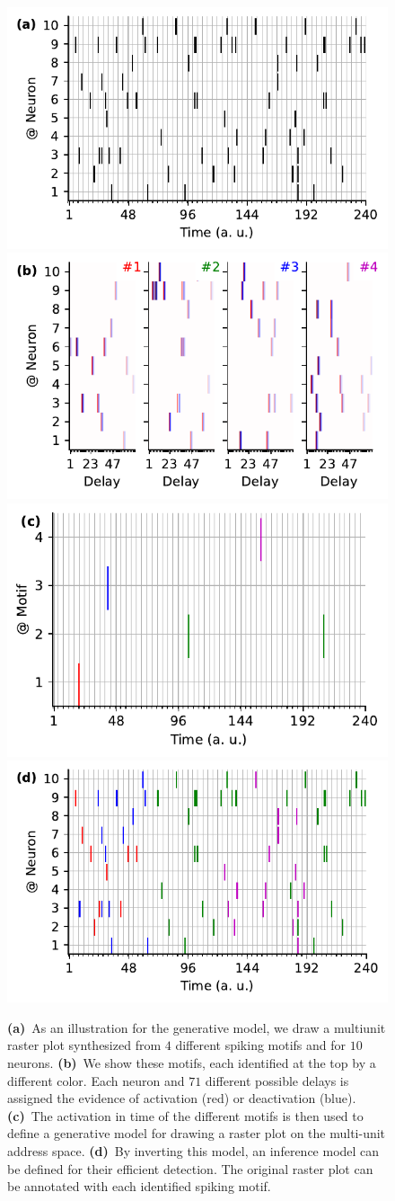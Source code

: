 \documentclass[runningheads]{llncs}
\begin{document}
\begin{figure}[t]%
    \includegraphics[width=.50\linewidth]{figures/THC_1a_k.pdf}
    \includegraphics[width=.46\linewidth]{figures/THC_1b.pdf}\\
  \includegraphics[width=.50\linewidth]{figures/THC_1c.pdf}
    \includegraphics[width=.50\linewidth]{figures/THC_1a.pdf}
  
\caption{\textbf{(a)}~As an illustration for the generative model, we draw a multiunit raster plot synthesized from $4$ different spiking motifs and for $10$ neurons. \textbf{(b)}~We show these motifs, each identified at the top by a different color. Each neuron and $71$ different possible delays is assigned the evidence of activation (red) or deactivation (blue). \textbf{(c)}~The activation in time of the different motifs is then used to define a generative model for drawing a raster plot on the multi-unit address space. \textbf{(d)}~By inverting this model, an inference model can be defined for their efficient detection. The original raster plot can be annotated with each identified spiking motif.
}
\label{fig:THC}
\end{figure}
\end{document}
